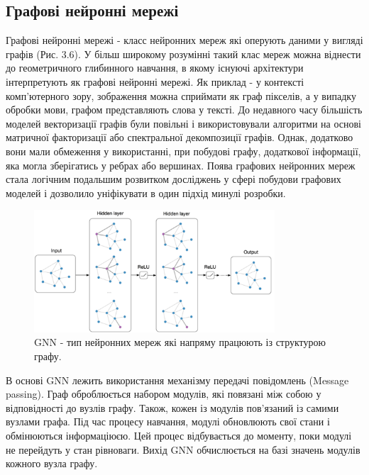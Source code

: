 \subsection{Графові нейронні мережі}
Графові нейронні мережі - класс нейронних мереж які оперують даними у вигляді графів (Рис. 3.6). У більш широкому розумінні такий клас мереж можна віднести до геометричного глибинного навчання, в якому існуючі архітектури інтерпретують як графові нейронні мережі. Як приклад - у контексті комп’ютерного зору, зображення можна сприймати як граф пікселів, а у випадку обробки мови, графом представляють слова у тексті. 
До недавного часу більшість моделей векторизації графів були повільні і використовували  алгоритми на основі матричної факторизації або спектральної декомпозиції графів. Однак, додатково вони мали обмеження у використанні, при побудові графу, додаткової інформації, яка могла зберігатись у ребрах або вершинах. Поява графових нейронних мереж стала логічним подальшим розвитком досліджень у сфері побудови графових моделей і дозволило уніфікувати в один підхід минулі розробки.

\begin{figure}
    \centering
    \includegraphics[width=0.8\textwidth]{images/GNN.png}
    \caption{GNN - тип нейронних мереж які напряму працюють із структурою графу.}
\end{figure}


В основі GNN лежить використання механізму передачі повідомлень (Message passing). Граф оброблюється набором модулів, які повязані між собою у відповідності до вузлів графу. Також, кожен із модулів пов’язаний із самими вузлами графа. Під час процесу навчання, модулі обновлюють свої стани і обмінюються інформаціюєю. 
Цей процес відбувається до моменту, поки модулі не перейдуть у стан рівноваги. Вихід GNN обчислюється на базі значень модулів кожного вузла графу.

